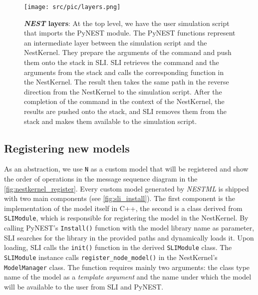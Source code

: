 \begin{figure}[h!]
\centering
\texttt{[image: src/pic/layers.png]}
\caption{\textbf{\emph{NEST} layers}: At the top level, we have the user simulation script that imports the PyNEST module. The PyNEST functions represent an intermediate layer between the simulation script and the NestKernel. They prepare the arguments of the command and push them onto the stack in SLI. SLI retrieves the command and the arguments from the stack and calls the corresponding function in the NestKernel. The result then takes the same path in the reverse direction from the NestKernel to the simulation script. After the completion of the command in the context of the NestKernel, the results are pushed onto the stack, and SLI removes them from the stack and makes them available to the simulation script.}
\label{fig:layer}
\end{figure}

\subsection{Registering new models}

As an abstraction, we use \texttt{N} as a custom model that will be registered and show the order of operations in the message sequence diagram in the \autoref{fig:nestkernel_register}. Every custom model generated by \emph{NESTML} is shipped with two main components (see \autoref{fig:sli_install}). The first component is the implementation of the model itself in C++, the second is a class derived from \texttt{SLIModule}, which is responsible for registering the model in the NestKernel. By calling PyNEST's \texttt{Install()} function with the model library name as parameter, SLI searches for the library in the provided paths and dynamically loads it. Upon loading, SLI calls the \texttt{init()} function in the derived \texttt{SLIModule} class. The \texttt{SLIModule} instance calls \texttt{register\_node\_model()} in the NestKernel's \texttt{ModelManager} class. The function requires mainly two arguments: the class type name of the model as a \emph{template argument} and the name under which the model will be available to the user from SLI and PyNEST.

